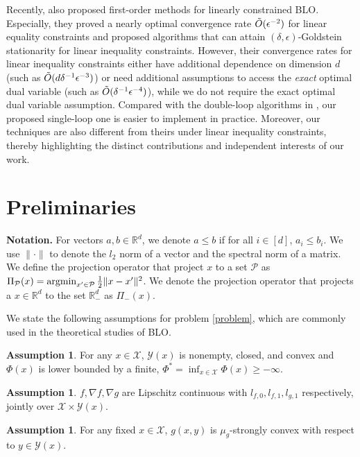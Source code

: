 \documentclass{article}
\newcommand{\Pc}{\mathcal{P}}
\newcommand{\Xc}{\mathcal{X}}
\newcommand{\Yc}{\mathcal{Y}}
\def\R{\mathbb{R}}
\newcommand{\argmin}{\mathop{\rm argmin}}
\theoremstyle{plain}
\theoremstyle{definition}
\newtheorem{assumption}[theorem]{Assumption}
\theoremstyle{remark}
\begin{document}
Recently, \cite{kornowski2024first} also proposed first-order methods for linearly constrained BLO. Especially, they proved a nearly optimal convergence rate $\Tilde{O}(\epsilon^{-2})$ for linear equality constraints and proposed algorithms that can attain $(\delta, \epsilon)$-Goldstein stationarity for linear inequality constraints. However, their convergence rates for linear inequality constraints either have additional dependence on dimension $d$ (such as $\Tilde{O}(d\delta^{-1}\epsilon^{-3})$) or need additional assumptions to access the \emph{exact} optimal dual variable (such as $\Tilde{O}(\delta^{-1}\epsilon^{-4})$), while we do not require the exact optimal dual variable assumption. Compared with the double-loop algorithms in \cite{kornowski2024first}, our proposed single-loop one is easier to implement in practice. Moreover, our techniques are also different from theirs under linear inequality constraints, thereby highlighting the distinct contributions and independent interests of our work.

\section{Preliminaries}
\textbf{Notation.} For vectors $a,b\in\R^d$, we denote $a\leq b$ if for all $i\in[d]$, $a_i\leq b_i$. We use $\|\cdot\|$ to denote the $l_2$ norm of a vector and the spectral norm of a matrix.
We define the projection operator that project $x$ to a set $\Pc$ as $\Pi_\Pc(x)=\argmin_{x'\in \Pc}\frac{1}{2}\|x-x'\|^2$. We denote the projection operator that projects a $x\in \R^d$ to the set $\R^d_-$ as $\Pi_-(x)$.

We state the following assumptions for problem \eqref{problem}, which are commonly used in the theoretical studies of BLO.

\begin{assumption}\label{assumption: phi}
For any $x\in \Xc$, $\Yc(x)$ is nonempty, closed, and convex and $\Phi(x)$ is lower bounded by a finite, $\Phi^*=\inf_{x\in \Xc}\Phi(x)\geq -\infty$.
\end{assumption}

\begin{assumption}\label{assumption: smooth}
$f, \nabla f, \nabla g$  are Lipschitz continuous with $l_{f,0},  l_{f,1}, l_{g,1}$ respectively, jointly over $\Xc \times \Yc(x)$.


\end{assumption}



\begin{assumption}\label{assumption: sc}
For any fixed $x\in \Xc$, $g(x,y)$ is $\mu_{g}$-strongly convex with respect to $y\in \Yc(x)$.
\end{assumption}
\end{document}
